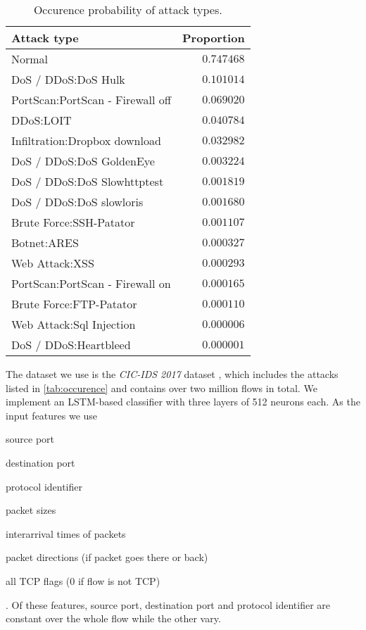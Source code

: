 \documentclass[sigconf,nonacm]{acmart}
\begin{document}
\begin{table}[b]
\caption{Occurence probability of attack types.} \label{tab:performance_results}
\begin{tabular}{l r} \toprule
Attack type & Proportion \\
\midrule
Normal                                                         & $0.747468$ \\
DoS / DDoS:DoS Hulk                                            & $0.101014$ \\
PortScan:PortScan - Firewall off                               & $0.069020$ \\
DDoS:LOIT                                                      & $0.040784$ \\
Infiltration:Dropbox download & $0.032982$ \\
DoS / DDoS:DoS GoldenEye                                       & $0.003224$ \\
DoS / DDoS:DoS Slowhttptest                                    & $0.001819$ \\
DoS / DDoS:DoS slowloris                                       & $0.001680$ \\
Brute Force:SSH-Patator                                        & $0.001107$ \\
Botnet:ARES                                                    & $0.000327$ \\
Web Attack:XSS                                                 & $0.000293$ \\
PortScan:PortScan - Firewall on                                & $0.000165$ \\
Brute Force:FTP-Patator                                        & $0.000110$ \\
Web Attack:Sql Injection                                       & $0.000006$ \\
DoS / DDoS:Heartbleed                                          & $0.000001$ \\
\bottomrule
\end{tabular}
\label{tab:occurence}
\end{table}

The dataset we use is the \textit{CIC-IDS 2017} dataset \cite{sharafaldin_toward_2018}, which includes the attacks listed in \autoref{tab:occurence} and contains over two million flows in total. We implement an LSTM-based classifier with three layers of 512 neurons each. As the input features we use \begin{itemize*}
\item source port
\item destination port
\item protocol identifier
\item packet sizes
\item interarrival times of packets
\item packet directions (if packet goes there or back)
\item all TCP flags (0 if flow is not TCP)
\end{itemize*}. Of these features, source port, destination port and protocol identifier are constant over the whole flow while the other vary. 
\end{document}
